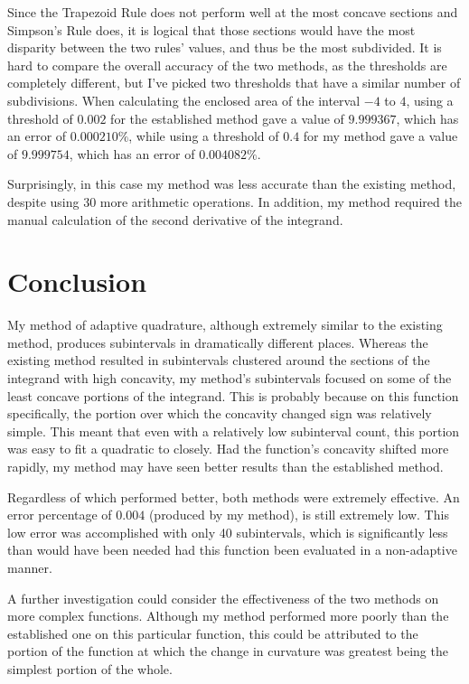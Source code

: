 \documentclass{paper}
\begin{document}
Since the Trapezoid Rule does not perform well at the most concave sections and Simpson's Rule does, it is logical that those sections would have the most disparity between the two rules' values, and thus be the most subdivided.
It is hard to compare the overall accuracy of the two methods, as the thresholds are completely different, but I've picked two thresholds that have a similar number of subdivisions.
When calculating the enclosed area of the interval \(-4\) to \(4\), using a threshold of \(0.002\) for the established method gave a value of \(9.999367\), which has an error of \(0.000210\%\), while using a threshold of \(0.4\) for my method gave a value of \(9.999754\), which has an error of \(0.004082\%\).

Surprisingly, in this case my method was less accurate than the existing method, despite using 30 more arithmetic operations.
In addition, my method required the manual calculation of the second derivative of the integrand.

\section{Conclusion}
\label{sec:conclusion}
My method of adaptive quadrature, although extremely similar to the existing method, produces subintervals in dramatically different places.
Whereas the existing method resulted in subintervals clustered around the sections of the integrand with high concavity, my method's subintervals focused on some of the least concave portions of the integrand.
This is probably because on this function specifically, the portion over which the concavity changed sign was relatively simple.
This meant that even with a relatively low subinterval count, this portion was easy to fit a quadratic to closely.
Had the function's concavity shifted more rapidly, my method may have seen better results than the established method.

Regardless of which performed better, both methods were extremely effective. An error percentage of \(0.004\) (produced by my method), is still extremely low.
This low error was accomplished with only 40 subintervals, which is significantly less than would have been needed had this function been evaluated in a non-adaptive manner.

A further investigation could consider the effectiveness of the two methods on more complex functions.
Although my method performed more poorly than the established one on this particular function, this could be attributed to the portion of the function at which the change in curvature was greatest being the simplest portion of the whole.

\label{mylastpage}
\newpage
{}
\listoffigures
\vspace{1cm}
\listofsnippets
\vspace{1cm}
{}
\printbibliography
\thispagestyle{frontorback}
\end{document}
